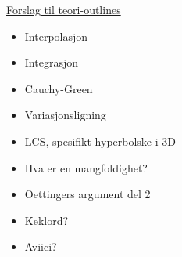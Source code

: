 



\begin{framed}
    \underline{Forslag til teori-outlines}
    \begin{itemize}
        \item Interpolasjon
        \item Integrasjon
        \item Cauchy-Green
        \item Variasjonsligning
        \item LCS, spesifikt hyperbolske i 3D
        \item Hva er en mangfoldighet?
        \item Oettingers argument del 2
        \item Keklord?
        \item Aviici?
    \end{itemize}
\end{framed}
